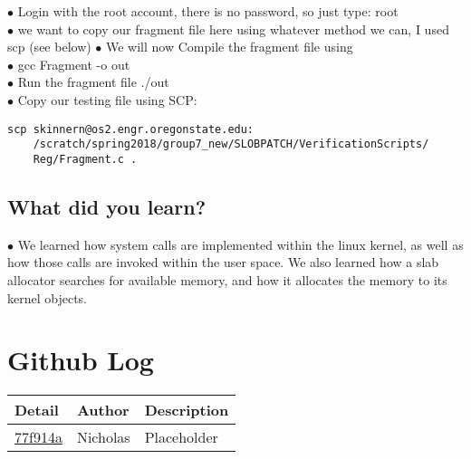 \documentclass[letterpaper,10pt,fleqn,draftclsnofoot,onecolumn]{IEEEtran}
\begin{document}
	$\bullet$ Login with the root account, there is no password, so just type: root\\
	$\bullet$ we want to copy our fragment file here using whatever method we can, I used scp (see below)
	$\bullet$ We will now Compile the fragment file using\\
	$\bullet$ gcc Fragment -o out\\
	$\bullet$ Run the fragment file ./out\\
	$\bullet$ Copy our testing file using SCP: \begin{verbatim}scp skinnern@os2.engr.oregonstate.edu:
	/scratch/spring2018/group7_new/SLOBPATCH/VerificationScripts/
	Reg/Fragment.c . \end{verbatim}

	\subsection{What did you learn?}
	$\bullet$ We learned how system calls are implemented within the linux kernel, as well as how those calls are invoked within the user space. We also learned how a slab allocator searches for available memory, and how it allocates the memory to its kernel objects.

	\section*{ Github Log }
	\begin{tabular}{l l p{1.5in}}\textbf{Detail} & \textbf{Author} & \textbf{Description}\\\hline
		\href{https://github.com/Skinnern/CS444/commit/77f914a6fe466b8115d31d7a97e08b2e86b00b7a}{77f914a} & Nicholas & Placeholder\\\hline

	\end{tabular}
	
	
\end{document}
